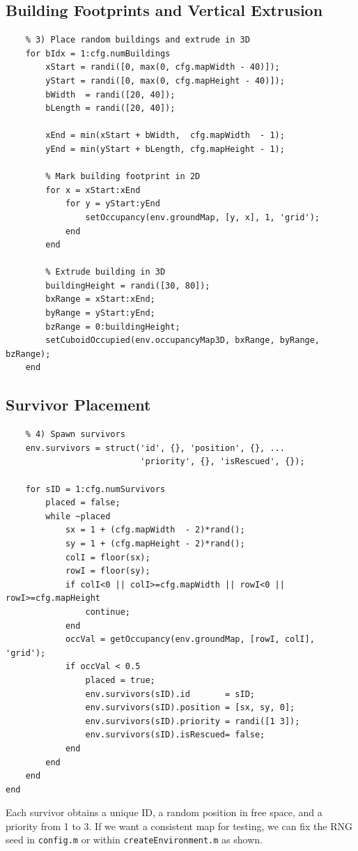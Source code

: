 \documentclass[12pt,a4paper]{report}
\begin{document}
\subsection*{Building Footprints and Vertical Extrusion}
\begin{verbatim}
    % 3) Place random buildings and extrude in 3D
    for bIdx = 1:cfg.numBuildings
        xStart = randi([0, max(0, cfg.mapWidth - 40)]);
        yStart = randi([0, max(0, cfg.mapHeight - 40)]);
        bWidth  = randi([20, 40]);
        bLength = randi([20, 40]);

        xEnd = min(xStart + bWidth,  cfg.mapWidth  - 1);
        yEnd = min(yStart + bLength, cfg.mapHeight - 1);

        % Mark building footprint in 2D
        for x = xStart:xEnd
            for y = yStart:yEnd
                setOccupancy(env.groundMap, [y, x], 1, 'grid');
            end
        end

        % Extrude building in 3D
        buildingHeight = randi([30, 80]);
        bxRange = xStart:xEnd;
        byRange = yStart:yEnd;
        bzRange = 0:buildingHeight;
        setCuboidOccupied(env.occupancyMap3D, bxRange, byRange, bzRange);
    end
\end{verbatim}

\subsection*{Survivor Placement}
\begin{verbatim}
    % 4) Spawn survivors
    env.survivors = struct('id', {}, 'position', {}, ...
                           'priority', {}, 'isRescued', {});

    for sID = 1:cfg.numSurvivors
        placed = false;
        while ~placed
            sx = 1 + (cfg.mapWidth  - 2)*rand();
            sy = 1 + (cfg.mapHeight - 2)*rand();
            colI = floor(sx);
            rowI = floor(sy);
            if colI<0 || colI>=cfg.mapWidth || rowI<0 || rowI>=cfg.mapHeight
                continue;
            end
            occVal = getOccupancy(env.groundMap, [rowI, colI], 'grid');
            if occVal < 0.5
                placed = true;
                env.survivors(sID).id       = sID;
                env.survivors(sID).position = [sx, sy, 0];
                env.survivors(sID).priority = randi([1 3]);
                env.survivors(sID).isRescued= false;
            end
        end
    end
end
\end{verbatim}
Each survivor obtains a unique ID, a random position in free space, and a
priority from 1 to 3. If we want a consistent map for testing, we can fix the RNG
seed in \texttt{config.m} or within \texttt{createEnvironment.m} as shown.
\end{document}
